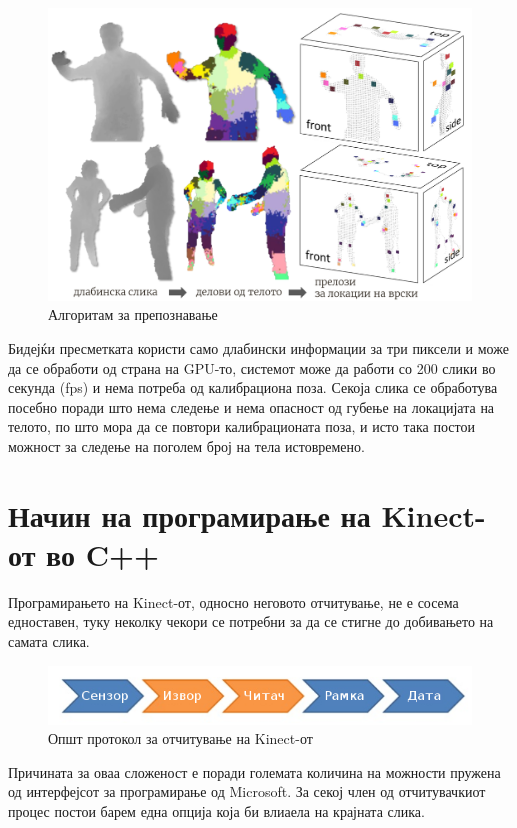 \documentclass[12pt]{article}
\begin{document}
  \begin{figure}[H]
    \includegraphics[width=0.75\linewidth]{./images/bodyparts.png}
    \centering
    \caption{Алгоритам за препознавање}
    \label{fig:bodyparts.png}
    \end{figure}

  Бидејќи пресметката користи само длабински информации за три пиксели и може да се обработи од страна на GPU-то, системот може да работи со 200 слики во секунда (fps) и нема потреба од калибрациона поза. Секоја слика се обработува посебно поради што нема следење и нема опасност од губење на локацијата на телото, по што мора да се повтори калибрационата поза, и исто така постои можност за следење на поголем број на тела истовремено.

\newpage

\section{Начин на програмирање на Kinect-от во C++}
  Програмирањето на Kinect-от, односно неговото отчитување, не е сосема едноставен, туку неколку чекори се потребни за да се стигне до добивањето на самата слика.

  \begin{figure}[H]
    \includegraphics[width=0.75\linewidth]{./images/programming_flow_trimmed.png}
    \centering
    \caption{Општ протокол за отчитување на Kinect-от}
    \label{fig:programming_flow_trimmed.png}
    \end{figure}

  Причината за оваа сложеност е поради големата количина на можности пружена од интерфејсот за програмирање од Microsoft. За секој член од отчитувачкиот процес постои барем една опција која би влиаела на крајната слика.
\end{document}
